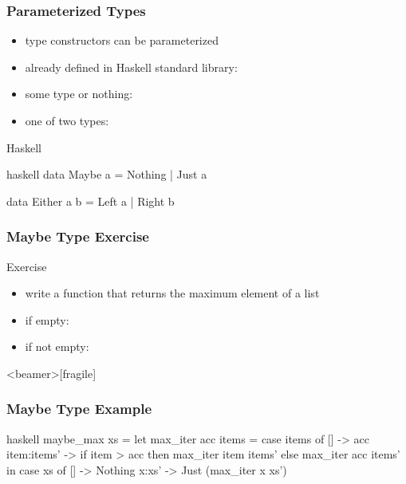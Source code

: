 \documentclass[dvipsnames]{beamer}
\theoremstyle{plain}
\begin{document}
\begin{frame}[fragile]
  \frametitle{Parameterized Types}

  \begin{itemize}
    \item type constructors can be parameterized

    \pause
    \bigskip
    \item already defined in Haskell standard library:
    \item some type or nothing: 
    \item one of two types: 
  \end{itemize}

  \begin{block}{Haskell}
    \begin{pygments}{haskell}
data Maybe a = Nothing | Just a

data Either a b = Left a | Right b
    \end{pygments}
  \end{block}
\end{frame}

\begin{frame}
  \frametitle{Maybe Type Exercise}

  \begin{block}{Exercise}
    \begin{itemize}
      \item write a function that returns the maximum element of a list
      \item if empty: 
      \item if not empty: 
    \end{itemize}
  \end{block}
\end{frame}

\begin{frame}<beamer>[fragile]
  \frametitle{Maybe Type Example}

  \begin{example}
    \begin{pygments}{haskell}
maybe_max xs =
    let
       max_iter acc items =
           case items of
             [] -> acc
             item:items' -> if item > acc
                            then max_iter item items'
                            else max_iter acc items'
    in
        case xs of
          [] -> Nothing
          x:xs' -> Just (max_iter x xs')
    \end{pygments}
  \end{example}
\end{frame}
\end{document}
